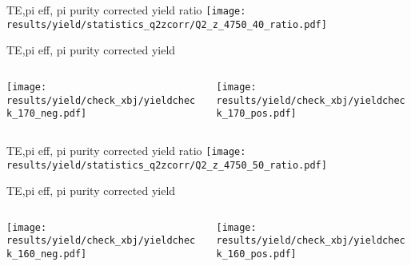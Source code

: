 \begin{frame}{TE,pi eff, pi purity corrected yield ratio}
\texttt{[image: results/yield/statistics\_q2zcorr/Q2\_z\_4750\_40\_ratio.pdf]}
\end{frame}
\begin{frame}{TE,pi eff, pi purity corrected yield}
\begin{columns}
\begin{column}[T]{0.5\textwidth}
\texttt{[image: results/yield/check\_xbj/yieldcheck\_170\_neg.pdf]}
\end{column}
\begin{column}[T]{0.5\textwidth}
\texttt{[image: results/yield/check\_xbj/yieldcheck\_170\_pos.pdf]}
\end{column}
\end{columns}
\end{frame}
\begin{frame}{TE,pi eff, pi purity corrected yield ratio}
\texttt{[image: results/yield/statistics\_q2zcorr/Q2\_z\_4750\_50\_ratio.pdf]}
\end{frame}
\begin{frame}{TE,pi eff, pi purity corrected yield}
\begin{columns}
\begin{column}[T]{0.5\textwidth}
\texttt{[image: results/yield/check\_xbj/yieldcheck\_160\_neg.pdf]}
\end{column}
\begin{column}[T]{0.5\textwidth}
\texttt{[image: results/yield/check\_xbj/yieldcheck\_160\_pos.pdf]}
\end{column}
\end{columns}
\end{frame}
